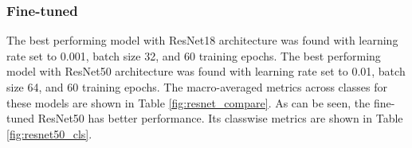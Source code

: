 
\subsubsection{Fine-tuned}
The best performing model with ResNet18 architecture was found with learning rate set to 0.001, batch size 32, and 60 training epochs. The best performing model with ResNet50 architecture was found with learning rate set to 0.01, batch size 64, and 60 training epochs. The macro-averaged metrics across classes for these models are shown in Table \ref{fig:resnet_compare}. As can be seen, the fine-tuned ResNet50 has better performance. Its classwise metrics are shown in Table \ref{fig:resnet50_cls}.

